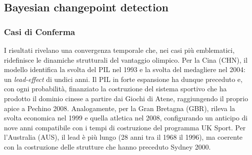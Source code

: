 \subsection{Bayesian changepoint detection}\label{sec:results_bayesian}


\subsubsection{Casi di Conferma}



I risultati rivelano una convergenza temporale che, nei casi più emblematici,
ridefinisce le dinamiche strutturali del vantaggio olimpico. Per la Cina (CHN),
il modello identifica la svolta del PIL nel 1993 e la svolta del medagliere nel
2004: un \textit{lead-effect} di undici anni. Il PIL in forte espansione ha
dunque preceduto e, con ogni probabilità, finanziato la costruzione del sistema
sportivo che ha prodotto il dominio cinese a partire dai Giochi di Atene,
raggiungendo il proprio apice a Pechino 2008. Analogamente, per la Gran Bretagna
(GBR), rileva la svolta economica nel 1999 e quella atletica nel 2008,
configurando un anticipo di nove anni compatibile con i tempi di costruzione del
programma UK Sport. Per l'Australia (AUS), il lead è più lungo (28 anni tra il
1968 il 1996), ma coerente con la costruzione delle strutture che hanno preceduto
Sydney 2000.


